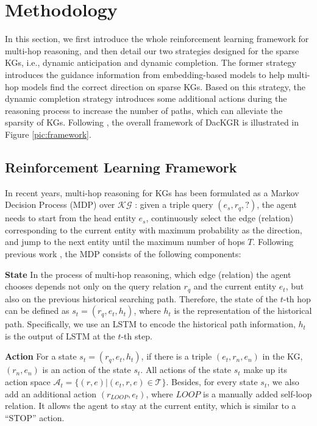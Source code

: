 \documentclass[11pt,a4paper]{article}
\begin{document}
\section{Methodology}

In this section, we first introduce the whole reinforcement learning framework for multi-hop reasoning, and then detail our two strategies designed for the sparse KGs, i.e., dynamic anticipation and dynamic completion.
The former strategy introduces the guidance information from embedding-based models to help multi-hop models find the correct direction on sparse KGs. Based on this strategy, the dynamic completion strategy introduces some additional actions during the reasoning process to increase the number of paths, which can alleviate the sparsity of KGs. Following \citet{MultiHop}, the overall framework of DacKGR is illustrated in Figure \ref{pic:framework}.

\subsection{Reinforcement Learning Framework}
\label{sec:framework}

In recent years, multi-hop reasoning for KGs has been formulated as a Markov Decision Process (MDP) over $\mathcal{KG}$ \cite{MINERVA}: given a triple query $(e_s, r_q, ?)$, the agent needs to start from the head entity $e_s$, continuously select the edge (relation) corresponding to the current entity with maximum probability as the direction, and jump to the next entity until the maximum number of hops $T$. Following previous work \cite{MultiHop}, the MDP consists of the following components:

\textbf{State} \indent In the process of multi-hop reasoning, which edge (relation) the agent chooses depends not only on the query relation $r_q$ and the current entity $e_t$, but also on the previous historical searching path. Therefore, the state of the $t$-th hop can be defined as $s_t = (r_q, e_t, h_t)$, where $h_t$ is the representation of the historical path. Specifically, we use an LSTM to encode the historical path information, $h_t$ is the output of LSTM at the $t$-th step.

\textbf{Action} \indent For a state $s_t = (r_q, e_t, h_t)$, if there is a triple $(e_t, r_n, e_n)$ in the KG, $(r_n, e_n)$ is an action of the state $s_t$. All actions of the state $s_t$ make up its action space $\mathcal{A}_t = \{(r, e) | (e_t, r, e) \in \mathcal{T}\}$. Besides, for every state $s_t$, we also add an additional action $(r_{\textit{LOOP}}, e_t)$, where $\textit{LOOP}$ is a manually added self-loop relation. It allows the agent to stay at the current entity, which is similar to a ``STOP'' action.
\end{document}
